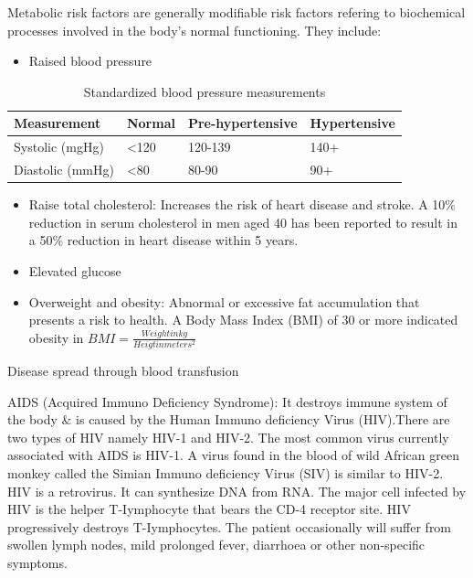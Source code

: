 \documentclass[
  openany]{book}
\providecommand{\tightlist}{%
  \setlength{\itemsep}{0pt}\setlength{\parskip}{0pt}}
\begin{document}
Metabolic risk factors are generally modifiable risk factors refering to biochemical processes involved in the body's normal functioning. They include:

\begin{itemize}
\tightlist
\item
  Raised blood pressure
\end{itemize}

\begin{table}

\caption{\label{tab:blood-pressure-measure}Standardized blood pressure measurements}
\centering
\begin{tabular}[t]{llll}
\toprule
Measurement & Normal & Pre-hypertensive & Hypertensive\\
\midrule
\rowcolor{gray!6}  Systolic (mgHg) & <120 & 120-139 & 140+\\
Diastolic (mmHg) & <80 & 80-90 & 90+\\
\bottomrule
\end{tabular}
\end{table}

\begin{itemize}
\tightlist
\item
  Raise total cholesterol: Increases the risk of heart disease and stroke. A 10\% reduction in serum cholesterol in men aged 40 has been reported to result in a 50\% reduction in heart disease within 5 years.
\item
  Elevated glucose
\item
  Overweight and obesity: Abnormal or excessive fat accumulation that presents a risk to health. A Body Mass Index (BMI) of 30 or more indicated obesity in \(BMI = \frac{Weight in kg}{Heigt in meters^2}\)
\end{itemize}

Disease spread through blood transfusion

AIDS (Acquired Immuno Deficiency Syndrome): It destroys immune system of the body \& is caused by the Human Immuno deficiency Virus (HIV).There are two types of HIV namely HIV-1 and HIV-2. The most common virus currently associated with AIDS is HIV-1. A virus found in the blood of wild African green monkey called the Simian Immuno deficiency Virus (SIV) is similar to HIV-2. HIV is a retrovirus. It can synthesize DNA from RNA. The major cell infected by HIV is the helper T-Iymphocyte that bears the CD-4 receptor site. HIV progressively destroys T-Iymphocytes. The patient occasionally will suffer from swollen lymph nodes, mild prolonged fever, diarrhoea or other non-specific symptoms.
\end{document}
